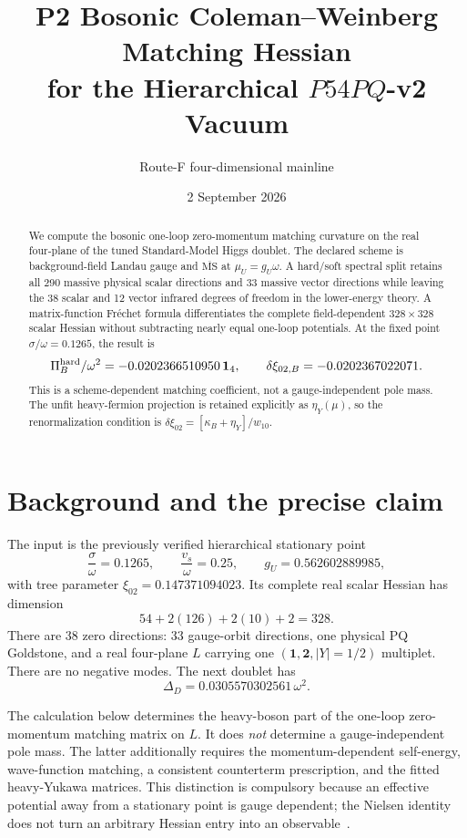 \documentclass[11pt]{article}
\title{P2 Bosonic Coleman--Weinberg Matching Hessian\\
for the Hierarchical \(P54PQ\)-v2 Vacuum}
\author{Route-F four-dimensional mainline}
\date{2 September 2026}
\newcommand{\MSbar}{\overline{\mathrm{MS}}}
\newcommand{\PiB}{\Pi_{B}^{\rm hard}}
\begin{document}
\maketitle

\begin{abstract}
We compute the bosonic one-loop zero-momentum matching curvature on the real
four-plane of the tuned Standard-Model Higgs doublet.  The declared scheme is
background-field Landau gauge and \(\MSbar\) at
\(\mu_U=g_U\omega\).  A hard/soft spectral split retains all 290 massive
physical scalar directions and 33 massive vector directions while leaving
the 38 scalar and 12 vector infrared degrees of freedom in the lower-energy
theory.  A matrix-function Fr\'echet formula differentiates the complete
field-dependent \(328\times328\) scalar Hessian without subtracting nearly
equal one-loop potentials.  At the fixed point
\(\sigma/\omega=0.1265\), the result is
\[
 \PiB/\omega^2=-0.0202366510950\,\bm 1_4,
 \qquad \delta\xi_{02,B}=-0.0202367022071.
\]
This is a scheme-dependent matching coefficient, not a gauge-independent
pole mass.  The unfit heavy-fermion projection is retained explicitly as
\(\eta_Y(\mu)\), so the renormalization condition is
\(\delta\xi_{02}=[\kappa_B+\eta_Y]/w_{10}\).
\end{abstract}

\tableofcontents

\section{Background and the precise claim}

The input is the previously verified hierarchical stationary point
\begin{equation}
 \frac{\sigma}{\omega}=0.1265,\qquad
 \frac{v_s}{\omega}=0.25,\qquad
 g_U=0.562602889985,
 \label{eq:background}
\end{equation}
with tree parameter \(\xi_{02}=0.147371094023\).  Its complete real scalar
Hessian has dimension
\[
 54+2(126)+2(10)+2=328.
\]
There are 38 zero directions: 33 gauge-orbit directions, one physical PQ
Goldstone, and a real four-plane \(L\) carrying one
\((\bm1,\bm2,|Y|=1/2)\) multiplet.  There are no negative modes.  The next
doublet has
\begin{equation}
 \Delta_D=0.0305570302561\,\omega^2.
 \label{eq:gap}
\end{equation}

The calculation below determines the heavy-boson part of the one-loop
zero-momentum matching matrix on \(L\).  It does \emph{not} determine a
gauge-independent pole mass.  The latter additionally requires the
momentum-dependent self-energy, wave-function matching, a consistent
counterterm prescription, and the fitted heavy-Yukawa matrices.  This
distinction is compulsory because an effective potential away from a
stationary point is gauge dependent; the Nielsen identity does not turn an
arbitrary Hessian entry into an observable~\cite{Nielsen1975}.
\end{document}
